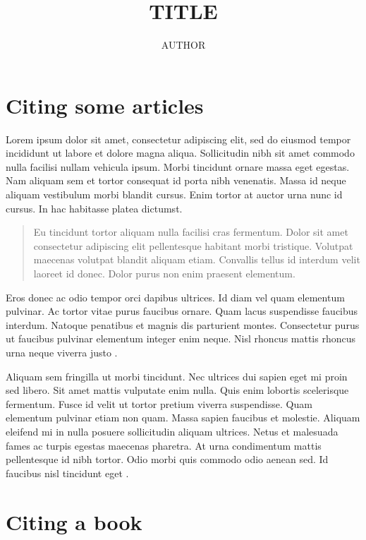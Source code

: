 \documentclass[a4paper]{article}
\title{TITLE}
\author{AUTHOR}
\date{\formatdate{4}{10}{2023}}
\begin{document}
\maketitle

\section{Citing some articles}

Lorem ipsum dolor sit amet, consectetur adipiscing elit, sed do eiusmod tempor incididunt ut labore et dolore magna aliqua. Sollicitudin nibh sit amet commodo nulla facilisi nullam vehicula ipsum. Morbi tincidunt ornare massa eget egestas. Nam aliquam sem et tortor consequat id porta nibh venenatis. Massa id neque aliquam vestibulum morbi blandit cursus. Enim tortor at auctor urna nunc id cursus. In hac habitasse platea dictumst.

\begin{quote}
	Eu tincidunt tortor aliquam nulla facilisi cras fermentum. Dolor sit amet consectetur adipiscing elit pellentesque habitant morbi tristique. Volutpat maecenas volutpat blandit aliquam etiam. Convallis tellus id interdum velit laoreet id donec. Dolor purus non enim praesent elementum.
\end{quote}

Eros donec ac odio tempor orci dapibus ultrices. Id diam vel quam elementum pulvinar. Ac tortor vitae purus faucibus ornare. Quam lacus suspendisse faucibus interdum. Natoque penatibus et magnis dis parturient montes. Consectetur purus ut faucibus pulvinar elementum integer enim neque. Nisl rhoncus mattis rhoncus urna neque viverra justo \autocite{future-sex}.

\bigskip

Aliquam sem fringilla ut morbi tincidunt. Nec ultrices dui sapien eget mi proin sed libero. Sit amet mattis vulputate enim nulla. Quis enim lobortis scelerisque fermentum. Fusce id velit ut tortor pretium viverra suspendisse. Quam elementum pulvinar etiam non quam. Massa sapien faucibus et molestie. Aliquam eleifend mi in nulla posuere sollicitudin aliquam ultrices. Netus et malesuada fames ac turpis egestas maecenas pharetra. At urna condimentum mattis pellentesque id nibh tortor. Odio morbi quis commodo odio aenean sed. Id faucibus nisl tincidunt eget \autocite{nonverbal-overload}.

\section{Citing a book}
\end{document}

